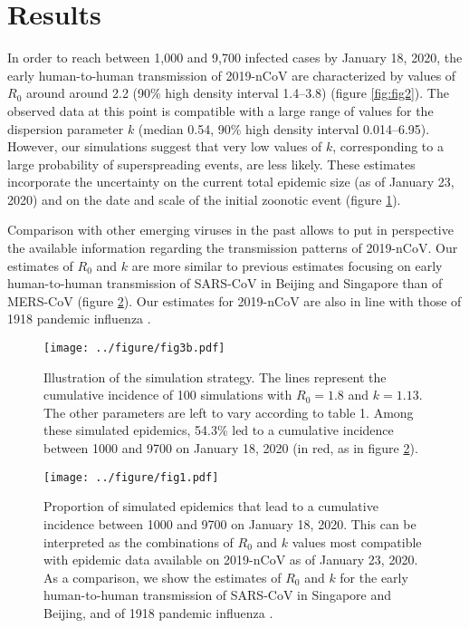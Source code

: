 \documentclass{article}
\begin{document}
\section*{Results}
In order to reach between 1,000 and 9,700 infected cases by January 18, 2020, the early human-to-human transmission of 2019-nCoV are characterized by values of $R_0$ around around 2.2 (90\% high density interval 1.4--3.8) (figure \ref{fig:fig2}).
The observed data at this point is compatible with a large range of values for the dispersion parameter $k$ (median 0.54, 90\% high density interval 0.014--6.95).
However, our simulations suggest that very low values of $k$, corresponding to a large probability of superspreading events, are less likely.
These estimates incorporate the uncertainty on the current total epidemic size (as of January 23, 2020) and on the date and scale of the initial zoonotic event (figure \ref{fig:fig3}).


Comparison with other emerging viruses in the past allows to put in perspective the available information regarding the transmission patterns of 2019-nCoV.
Our estimates of $R_0$ and $k$ are more similar to previous estimates focusing on early human-to-human transmission of SARS-CoV in Beijing and Singapore\cite{Lloyd-Smith:2005} than of MERS-CoV\cite{Kucharski:2015b} (figure \ref{fig:fig1}).
Our estimates for 2019-nCoV are also in line with those of 1918 pandemic influenza \cite{Fraser:2011}.



\begin{figure}[t]
	\centering
	\texttt{[image: ../figure/fig3b.pdf]}
	\caption{Illustration of the simulation strategy. The lines represent the cumulative incidence of 100 simulations with $R_0=1.8$ and $k=1.13$. The other parameters are left to vary according to table 1. Among these simulated epidemics, 54.3\% led to a cumulative incidence between 1000 and 9700 on January 18, 2020 (in red, as in figure \ref{fig:fig1}).}
	\label{fig:fig3}
\end{figure}


\begin{figure}[t]
	\centering
	\texttt{[image: ../figure/fig1.pdf]}
	\caption{Proportion of simulated epidemics that lead to a cumulative incidence between 1000 and 9700 on January 18, 2020. This can be interpreted as the combinations of $R_0$ and $k$ values most compatible with epidemic data available on 2019-nCoV as of January 23, 2020. As a comparison, we show the estimates of $R_0$ and $k$ for the early human-to-human transmission of SARS-CoV in Singapore and Beijing, and of 1918 pandemic influenza \cite{Lloyd-Smith:2005,Fraser:2011,Kucharski:2015b}.
	}
	\label{fig:fig1}
\end{figure}
\end{document}
